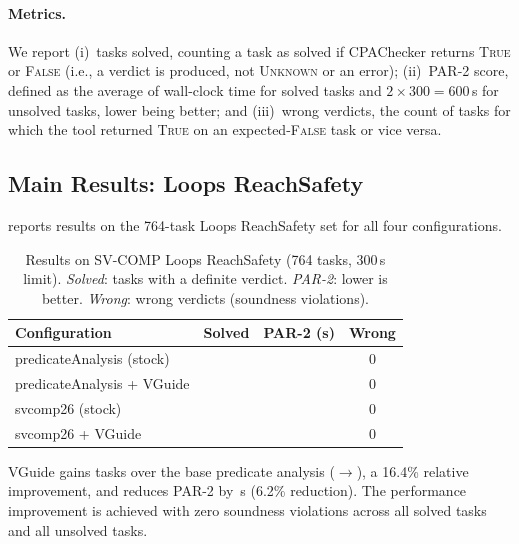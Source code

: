 \paragraph{Metrics.} We report (i)~tasks solved, counting a task as solved if
CPAChecker returns \textsc{True} or \textsc{False} (i.e., a verdict is produced, not
\textsc{Unknown} or an error); (ii)~PAR-2 score, defined as the average of wall-clock
time for solved tasks and $2 \times 300 = 600$\,s for unsolved tasks, lower being
better; and (iii)~wrong verdicts, the count of tasks for which the tool returned
\textsc{True} on an expected-\textsc{False} task or vice versa.

\subsection{Main Results: Loops ReachSafety}

 reports results on the 764-task Loops ReachSafety set for all
four configurations.

\begin{table}[t]
  \caption{Results on SV-COMP Loops ReachSafety (764 tasks, 300\,s limit).
           \emph{Solved}: tasks with a definite verdict. \emph{PAR-2}: lower is
           better. \emph{Wrong}: wrong verdicts (soundness violations).}
  \label{tab:loops}
  \centering
  \begin{tabular}{lccc}
    \toprule
    Configuration & Solved & PAR-2 (s) & Wrong \\
    \midrule
    predicateAnalysis (stock)   & \LoopsStock{}          & \LoopsPARStock{}          & 0 \\
    predicateAnalysis + VGuide  & \LoopsVGuide{}         & \LoopsPARVGuide{}         & 0 \\
    \addlinespace
    svcomp26 (stock)            & \PortfolioLoopsStock{} & \PortfolioPARStock{}      & 0 \\
    svcomp26 + VGuide           & \PortfolioLoopsVGuide{}& \PortfolioPARVGuide{}     & 0 \\
    \bottomrule
  \end{tabular}
\end{table}

VGuide gains \LoopsDelta{} tasks over the base predicate analysis
(\LoopsStock{}$\to$\LoopsVGuide{}), a 16.4\% relative improvement, and reduces PAR-2
by \LoopsPARDelta{}\,s (6.2\% reduction). The performance improvement is achieved with
zero soundness violations across all \LoopsVGuide{} solved tasks and all unsolved tasks.

